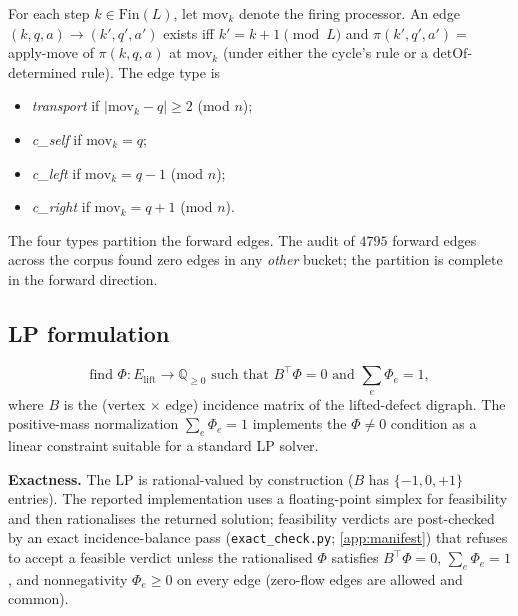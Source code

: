 \documentclass[11pt,a4paper]{article}
\theoremstyle{plain}
\theoremstyle{definition}
\newcommand{\detOf}{\mathrm{detOf}}
\begin{document}
For each step $k \in \mathrm{Fin}(L)$, let $\mathrm{mov}_k$ denote the
firing processor.  An edge $(k, q, a) \to (k', q', a')$ exists iff
$k' = k + 1 \pmod{L}$ and $\pi(k', q', a') = $ apply-move of
$\pi(k, q, a)$ at $\mathrm{mov}_k$ (under either the cycle's rule or a
$\detOf$-determined rule).  The edge type is
\begin{itemize}[leftmargin=*]
\item \emph{transport} if $|\mathrm{mov}_k - q| \ge 2$ (mod $n$);
\item \emph{c\_self}  if $\mathrm{mov}_k = q$;
\item \emph{c\_left}  if $\mathrm{mov}_k = q - 1$ (mod $n$);
\item \emph{c\_right} if $\mathrm{mov}_k = q + 1$ (mod $n$).
\end{itemize}
The four types partition the forward edges.  The audit of $4795$
forward edges across the corpus found zero edges in any
\emph{other} bucket; the partition is complete in the forward direction.

\subsection{LP formulation}\label{app:detector-lp}

\[
   \text{find } \Phi : E_{\mathrm{lift}} \to \mathbb{Q}_{\ge 0}
   \text{ such that } B^\top \Phi = 0 \text{ and }
   \textstyle\sum_{e} \Phi_e = 1,
\]
where $B$ is the (vertex $\times$ edge) incidence matrix of the
lifted-defect digraph.  The positive-mass normalization
$\sum_e \Phi_e = 1$ implements the $\Phi \ne 0$ condition as a
linear constraint suitable for a standard LP solver.

\textbf{Exactness.} The LP is rational-valued by construction ($B$
has $\{-1, 0, +1\}$ entries).  The reported implementation uses a
floating-point simplex for feasibility and then rationalises the
returned solution; feasibility verdicts are post-checked by an exact
incidence-balance pass (\texttt{exact\_check.py};
\cref{app:manifest}) that refuses to accept a feasible verdict
unless the rationalised $\Phi$ satisfies
$B^\top \Phi = 0$, $\sum_e \Phi_e = 1$, and nonnegativity
$\Phi_e \ge 0$ on every edge (zero-flow edges are allowed and
common).
\end{document}

